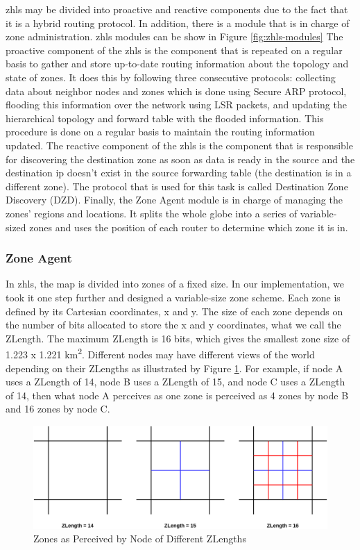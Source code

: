 \acrfull{zhls} may be divided into proactive and reactive components due to the fact that it is a hybrid routing protocol. In addition, there is a module that is in charge of zone administration. \acrshort{zhls} modules can be show in Figure  \ref{fig:zhls-modules} 
The proactive component of the \acrshort{zhls} is the component that is repeated on a regular basis to gather and store up-to-date routing information about the topology and state of zones. It does this by following three consecutive protocols: collecting data about neighbor nodes and zones which is done using Secure ARP protocol, flooding this information over the network using LSR packets, and updating the hierarchical topology and forward table with the flooded information. This procedure is done on a regular basis to maintain the routing information updated. 
The reactive component of the \acrshort{zhls} is the component that is responsible for discovering the destination zone as soon as data is ready in the source and the destination \acrshort{ip} doesn't exist in the source forwarding table (the destination is in a different zone). The protocol that is used for this task is called Destination Zone Discovery (DZD). 
Finally, the Zone Agent module is in charge of managing the zones' regions and locations. It splits the whole globe into a series of variable-sized zones and uses the position of each router to determine which zone it is in.

\subsubsection{Zone Agent}
\qquad In \acrshort{zhls}, the map is divided into zones of a fixed size. In our implementation, we took it one step further and designed a variable-size zone scheme. Each zone is defined by its Cartesian coordinates, x and y. The size of each zone depends on the number of bits allocated to store the x and y coordinates, what we call the ZLength. The maximum ZLength is 16 bits, which gives the smallest zone size of 1.223 x 1.221 km\textsuperscript{2}. Different nodes may have different views of the world depending on their ZLengths as illustrated by Figure \ref{fig:zlength}. For example, if node A uses a ZLength of 14, node B uses a ZLength of 15, and node C uses a ZLength of 14, then what node A perceives as one zone is perceived as 4 zones by node B and 16 zones by node C.

\begin{figure}[!htb]
    \centering
    \includegraphics[width=\linewidth]{images/zlength.png}
    \caption{Zones as Perceived by Node of Different ZLengths}
    \label{fig:zlength}
\end{figure}

